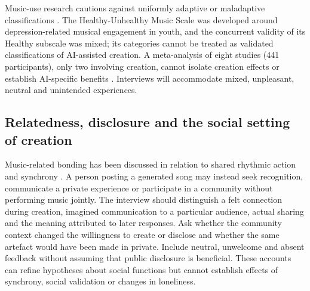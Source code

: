Music-use research cautions against uniformly adaptive or maladaptive classifications \citep{hums2015,carlson2015}. The Healthy-Unhealthy Music Scale was developed around depression-related musical engagement in youth, and the concurrent validity of its Healthy subscale was mixed; its categories cannot be treated as validated classifications of AI-assisted creation. A meta-analysis of eight studies (441 participants), only two involving creation, cannot isolate creation effects or establish AI-specific benefits \citep{peters2024}. Interviews will accommodate mixed, unpleasant, neutral and unintended experiences.

\subsection{Relatedness, disclosure and the social setting of creation}
Music-related bonding has been discussed in relation to shared rhythmic action and synchrony \citep{tarr2014}. A person posting a generated song may instead seek recognition, communicate a private experience or participate in a community without performing music jointly. The interview should distinguish a felt connection during creation, imagined communication to a particular audience, actual sharing and the meaning attributed to later responses. Ask whether the community context changed the willingness to create or disclose and whether the same artefact would have been made in private. Include neutral, unwelcome and absent feedback without assuming that public disclosure is beneficial. These accounts can refine hypotheses about social functions but cannot establish effects of synchrony, social validation or changes in loneliness.

